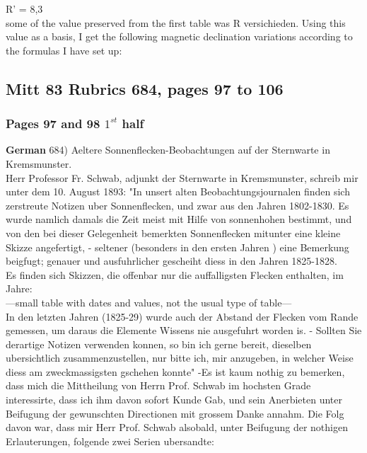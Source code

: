 \documentclass[12pt]{article}
\begin{document}
R' = 8,3\\

some of the value preserved from the first table was R versichieden. Using this value as a basis, I get the following magnetic declination variations according to the formulas I have set up:\\

\hdots {}


\subsection{Mitt 83 Rubrics 684, pages 97 to 106}\label{mitt:rub 684}

\subsubsection{Pages 97 and 98 $1^{st}$ half}\label{mitt:rub 684 intro}
\textbf{German}
684) Aeltere Sonnenflecken-Beobachtungen auf der Sternwarte in Kremsmunster.\\

Herr Professor Fr. Schwab, adjunkt der Sternwarte in Kremsmunster, schreib mir unter dem 10. August 1893: "In unsert alten Beobachtungsjournalen finden sich zerstreute Notizen uber Sonnenflecken, und zwar aus den Jahren 1802-1830. Es wurde namlich damals die Zeit meist mit Hilfe von sonnenhohen bestimmt, und von den bei dieser Gelegenheit bemerkten Sonnenflecken mitunter eine kleine Skizze angefertigt, - seltener (besonders in den ersten Jahren ) eine Bemerkung beigfugt; genauer und ausfuhrlicher gescheiht diess in den Jahren 1825-1828.\\

Es finden sich Skizzen, die offenbar nur die auffalligsten Flecken enthalten, im Jahre: \\

---small table with dates and values, not the usual type of table---\\

In den letzten Jahren (1825-29) wurde auch der Abstand der Flecken vom Rande gemessen, um daraus die Elemente Wissens nie ausgefuhrt worden is. - Sollten Sie derartige Notizen verwenden konnen, so bin ich gerne bereit, dieselben ubersichtlich zusammenzustellen, nur bitte ich, mir anzugeben, in welcher Weise diess am zweckmassigsten gschehen konnte" 
-Es ist kaum nothig zu bemerken, dass mich die Mittheilung von Herrn Prof. Schwab im hochsten Grade interessirte, dass ich ihm davon sofort Kunde Gab, und sein Anerbieten unter Beifugung der gewunschten Directionen mit grossem Danke annahm. Die Folg davon war, dass mir Herr Prof. Schwab alsobald, unter Beifugung der nothigen Erlauterungen, folgende zwei Serien ubersandte:\\
\end{document}
